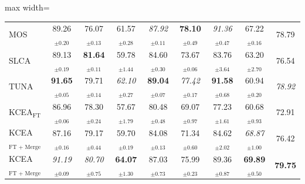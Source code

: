 \begin{table}[!t]
\begin{subtable}{\textwidth}
\begin{adjustbox}{max width=\textwidth}
\begin{tabular}{l c c c c c c c c}
MOS & 89.26$_{\pm 0.20}$ & 76.07$_{\pm 0.13}$ & 61.57$_{\pm 0.28}$ & \textit{87.92}$_{\pm 0.11}$ & \textbf{78.10}$_{\pm 0.49}$ & \textit{91.36}$_{\pm 0.47}$ & 67.22$_{\pm 0.16}$ & 78.79 \\
SLCA & 89.13$_{\pm 0.19}$ & \textbf{81.64}$_{\pm 0.11}$ & 59.78$_{\pm 1.44}$ & 84.60$_{\pm 0.30}$ & 73.67$_{\pm 0.06}$ & 83.76$_{\pm 3.64}$ & 63.20$_{\pm 2.70}$ & 76.54 \\
TUNA & \textbf{91.65}$_{\pm 0.05}$ & 79.71$_{\pm 0.14}$ & \textit{62.10}$_{\pm 0.27}$ & \textbf{89.04}$_{\pm 0.07}$ & \textit{77.42}$_{\pm 0.17}$ & \textbf{91.58}$_{\pm 0.68}$ & 60.94$_{\pm 0.20}$ & \textit{78.92} \\
\midrule
KCEA$_{\text{FT}}$ & 86.96$_{\pm 0.06}$ & 78.30$_{\pm 0.24}$ & 57.67$_{\pm 1.79}$ & 80.48$_{\pm 0.48}$ & 69.07$_{\pm 0.97}$ & 77.23$_{\pm 1.61}$ & 60.68$_{\pm 0.93}$ & 72.91 \\
KCEA$_{\text{FT + Merge}}$ & 87.16$_{\pm 0.16}$ & 79.17$_{\pm 0.44}$ & 59.70$_{\pm 0.19}$ & 84.08$_{\pm 0.13}$ & 71.34$_{\pm 0.60}$ & 84.62$_{\pm 2.02}$ & \textit{68.87}$_{\pm 1.00}$ & 76.42 \\
KCEA$_{\text{FT + Merge + Align}}$ & \textit{91.19}$_{\pm 0.09}$ & \textit{80.70}$_{\pm 0.75}$ & \textbf{64.07}$_{\pm 1.30}$ & 87.03$_{\pm 0.73}$ & 75.99$_{\pm 0.23}$ & 89.36$_{\pm 0.87}$ & \textbf{69.89}$_{\pm 0.50}$ & \textbf{79.75} \\
\bottomrule
\end{tabular}
\end{adjustbox}
\end{subtable}

\vspace{0.6em}


\end{table}
